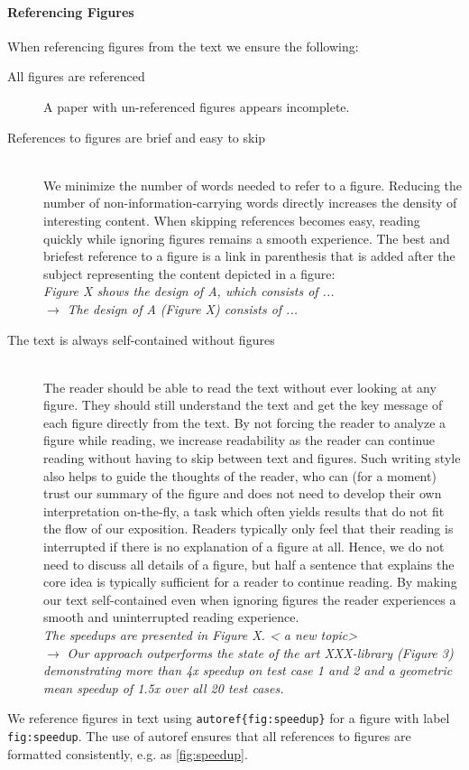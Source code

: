 \documentclass[a4paper]{article}
\newenvironment{draftonly}{}{}
\begin{document}
\begin{draftonly}
\paragraph{Referencing Figures} When referencing figures from the text we
ensure the following:
\begin{description}
      \item [All figures are referenced] A paper with un-referenced figures
	      appears incomplete.
      \item [References to figures are brief and easy to skip]~\\
                We minimize the number of words needed to refer to a figure. Reducing
                the number of non-information-carrying words directly increases
		the density of interesting content. When skipping references
		becomes easy, reading quickly while ignoring figures remains a
		smooth experience. The best and briefest reference to a figure
		is a link in parenthesis that is added after the subject
		representing the content depicted in a figure:\\
		{\color{pairedTwoDarkBlue}\textit{Figure
		X shows the design of A, which consists of ...}}\\
		$\to$ {\color{pairedFourDarkGreen}
		\textit{The design of A (Figure X) consists of ...}}
      \item [The text is always self-contained without figures] ~\\ The reader
                should be able to read the text without ever looking at any
                figure. They should still understand the text and get the key
		message of each figure directly from the text. By not forcing
		the reader to analyze a figure while reading, we increase
		readability as the reader can continue reading without having
		to skip between text and figures. Such writing style also helps
		to guide the thoughts of the reader, who can (for a moment)
		trust our summary of the figure and does not need to develop
		their own interpretation on-the-fly, a task which often yields
		results that do not fit the flow of our exposition. Readers
		typically only feel that their reading is interrupted if there
		is no explanation of a figure at all. Hence, we do not need to
		discuss all details of a figure, but half a sentence that explains the
		core idea is typically sufficient for a reader to continue
		reading.  By making
		our text self-contained even when ignoring figures the reader
		experiences a smooth and uninterrupted reading experience.\\
		{\color{pairedTwoDarkBlue}
		\textit{The speedups are presented in Figure X. < a new topic> }}\\
		$\to$ {\color{pairedFourDarkGreen}\textit{Our approach outperforms the state of the art
		XXX-library (Figure 3) demonstrating more than 4x speedup on
		test case 1 and 2 and a geometric mean speedup of 1.5x over all
		20 test cases.}}
\end{description}
We reference figures in text using
\texttt{autoref\{fig:speedup\}} for a figure with label
\texttt{fig:speedup}.  The use of autoref ensures that all references
to figures are formatted consistently, e.g. as \autoref{fig:speedup}.


\end{draftonly}
\end{document}
